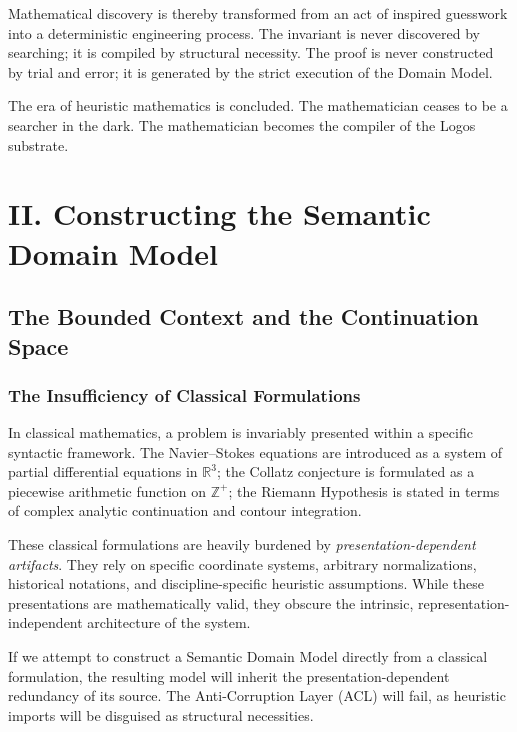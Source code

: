 \documentclass[12pt,openany]{extbook}
\theoremstyle{plain}
\theoremstyle{definition}
\begin{document}
Mathematical discovery is thereby transformed from an act of inspired guesswork into a deterministic engineering process. The invariant is never discovered by searching; it is compiled by structural necessity. The proof is never constructed by trial and error; it is generated by the strict execution of the Domain Model.

The era of heuristic mathematics is concluded. The mathematician ceases to be a searcher in the dark. The mathematician becomes the compiler of the Logos substrate.

\part{II. Constructing the Semantic Domain Model}

\chapter{The Bounded Context and the Continuation Space}

\section{The Insufficiency of Classical Formulations}

In classical mathematics, a problem is invariably presented within a specific syntactic framework. The Navier--Stokes equations are introduced as a system of partial differential equations in $\mathbb{R}^3$; the Collatz conjecture is formulated as a piecewise arithmetic function on $\mathbb{Z}^+$; the Riemann Hypothesis is stated in terms of complex analytic continuation and contour integration. 

These classical formulations are heavily burdened by \emph{presentation-dependent artifacts}. They rely on specific coordinate systems, arbitrary normalizations, historical notations, and discipline-specific heuristic assumptions. While these presentations are mathematically valid, they obscure the intrinsic, representation-independent architecture of the system. 

If we attempt to construct a Semantic Domain Model directly from a classical formulation, the resulting model will inherit the presentation-dependent redundancy of its source. The Anti-Corruption Layer (ACL) will fail, as heuristic imports will be disguised as structural necessities. 
\end{document}
